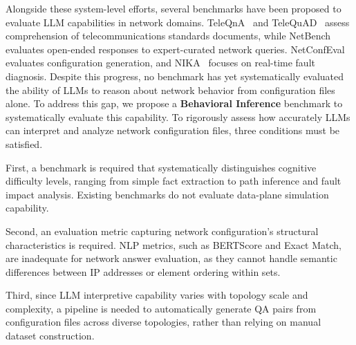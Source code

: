 Alongside these system-level efforts, several benchmarks have been proposed to evaluate LLM capabilities in network domains.
TeleQnA~\cite{ref9} and TeleQuAD~\cite{ref10} assess comprehension of telecommunications standards documents, while NetBench~\cite{ref11} evaluates open-ended responses to expert-curated network queries.
NetConfEval~\cite{wang2024netconfeval} evaluates configuration generation, and NIKA~\cite{wang2025network_arena} focuses on real-time fault diagnosis.
Despite this progress, no benchmark has yet systematically evaluated the ability of LLMs to reason about network behavior from configuration files alone.
To address this gap, we propose a \textbf{Behavioral Inference} benchmark to systematically evaluate this capability.
To rigorously assess how accurately LLMs can interpret and analyze network configuration files, three conditions must be satisfied.

First, a benchmark is required that systematically distinguishes cognitive difficulty levels, ranging from simple fact extraction to path inference and fault impact analysis. Existing benchmarks do not evaluate data-plane simulation capability.

Second, an evaluation metric capturing network configuration’s structural characteristics is required. NLP metrics, such as BERTScore and Exact Match, are inadequate for network answer evaluation, as they cannot handle semantic differences between IP addresses or element ordering within sets.

Third, since LLM interpretive capability varies with topology scale and complexity, a pipeline is needed to automatically generate QA pairs from configuration files across diverse topologies, rather than relying on manual dataset construction.



